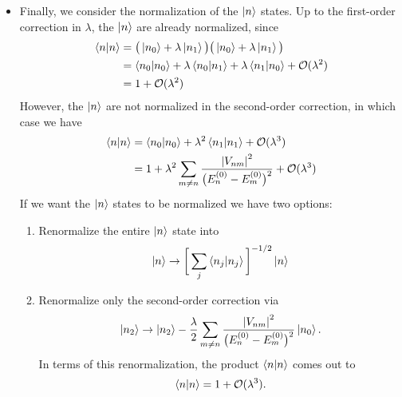 \documentclass[11pt, a4paper]{article}
\begin{document}
\begin{itemize}
    
    \item Finally, we consider the normalization of the $ \ket{n} $ states. Up to the first-order correction in $ \lambda $, the $ \ket{n} $ are already normalized, since
    \begin{align*}
        \braket{n}{n} &= \big( \ket{n_{0}} + \lambda \ket{n_{1}} \big)\big( \ket{n_{0}} + \lambda \ket{n_{1}} \big)\\
        &= \braket{n_{0}}{n_{0}} + \lambda \braket{n_{0}}{n_{1}} + \lambda \braket{n_{1}}{n_{0}} + \mathcal{O}(\lambda^{2})\\
        & = 1 + \mathcal{O}(\lambda^{2})
    \end{align*}
    However, the $ \ket{n} $ are not normalized in the second-order correction, in which case we have
    \begin{align*}
        \braket{n}{n} &= \braket{n_{0}}{n_{0}} + \lambda^{2} \braket{n_{1}}{n_{1}} + \mathcal{O}(\lambda^{3})\\
        & = 1 + \lambda^{2} \sum_{m \neq n} \frac{\abs{V_{nm}}^{2}}{\big( E_{n}^{(0)} - E_{m}^{(0)} \big)^{2}} + \mathcal{O}(\lambda^{3})
    \end{align*}
    If we want the $ \ket{n} $ states to be normalized we have two options:
    \begin{enumerate}
        \item Renormalize the entire $ \ket{n} $ state into
        \begin{equation*}
           \ket{n} \to \bigg[ \sum_{j} \braket{n_{j}}{n_{j}} \bigg]^{-1/2} \ket{n}
        \end{equation*}
        
        \item Renormalize only the second-order correction via
        \begin{equation*}
            \ket{n_{2}} \to \ket{n_{2}} - \frac{\lambda}{2} \sum_{m \neq n} \frac{\abs{V_{nm}}^{2}}{\big( E_{n}^{(0)} - E_{m}^{(0)} \big)^{2}}\ket{n_{0}}.
        \end{equation*}
        In terms of this renormalization, the product $ \braket{n}{n} $ comes out to
        \begin{equation*}
            \braket{n}{n} = 1 + \mathcal{O}(\lambda^{3}).
        \end{equation*}
        
    \end{enumerate}
    
\end{itemize}
\end{document}

